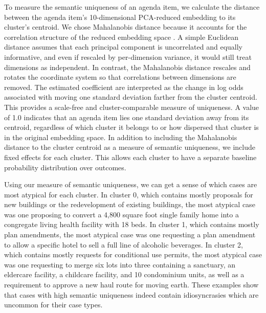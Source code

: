 To measure the semantic uniqueness of an agenda item, we calculate the distance between the agenda item's 10-dimensional PCA-reduced embedding to its cluster's centroid. We chose Mahalanobis distance because it accounts for the correlation structure of the reduced embedding space \citep[p. 93]{rencher2012}. A simple Euclidean distance assumes that each principal component is uncorrelated and equally informative, and even if rescaled by per-dimension variance, it would still treat dimensions as independent. In contrast, the Mahalanobis distance rescales and rotates the coordinate system so that correlations between dimensions are removed. The estimated coefficient are interpreted as the change in log odds associated with moving one standard deviation farther from the cluster centroid. This provides a scale-free and cluster-comparable measure of uniqueness. A value of 1.0 indicates that an agenda item lies one standard deviation away from its centroid, regardless of which cluster it belongs to or how dispersed that cluster is in the original embedding space. 
In addition to including the Mahalanobis distance to the cluster centroid as a measure of semantic uniqueness, we include fixed effects for each cluster. This allows each cluster to have a separate baseline probability distribution over outcomes.

Using our measure of semantic uniqueness, we can get a sense of which cases are most atypical for each cluster. In cluster 0, which contains mostly proposals for new buildings or the redevelopment of existing buildings, the most atypical case was one proposing to convert a 4,800 square foot single family home into a congregate living health facility with 18 beds. In cluster 1, which contains mostly plan amendments, the most atypical case was one requesting a plan amendment to allow a specific hotel to sell a full line of alcoholic beverages. In cluster 2, which contains mostly requests for conditional use permits, the most atypical case was one requesting to merge six lots into three containing a sanctuary, an eldercare facility, a childcare facility, and 10 condominium units, as well as a requirement to approve a new haul route for moving earth. These examples show that cases with high semantic uniqueness indeed contain idiosyncrasies which are uncommon for their case types.

